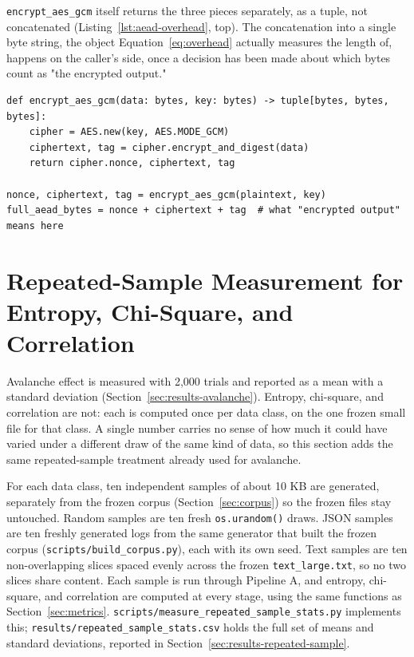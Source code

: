 \documentclass[12pt,a4paper,twoside]{report}
\numberwithin{equation}{chapter}
\begin{document}
\texttt{encrypt\_aes\_gcm} itself returns the three pieces separately,
as a tuple, not concatenated (Listing~\ref{lst:aead-overhead}, top).
The concatenation into a single byte string, the object Equation~\ref{eq:overhead} actually measures the length of, happens on
the caller's side, once a decision has been made about which bytes
count as "the encrypted output."

\begin{lstlisting}[caption={What gets concatenated into the full-AEAD
byte string that Equation~\ref{eq:overhead} is measured against
(\texttt{src/classical\_crypto.py},
\texttt{scripts/check\_aead\_overhead\_convention.py}).},
label={lst:aead-overhead}]
def encrypt_aes_gcm(data: bytes, key: bytes) -> tuple[bytes, bytes, bytes]:
    cipher = AES.new(key, AES.MODE_GCM)
    ciphertext, tag = cipher.encrypt_and_digest(data)
    return cipher.nonce, ciphertext, tag

nonce, ciphertext, tag = encrypt_aes_gcm(plaintext, key)
full_aead_bytes = nonce + ciphertext + tag  # what "encrypted output" means here
\end{lstlisting}

\section{Repeated-Sample Measurement for Entropy, Chi-Square, and Correlation}
\label{sec:repeated-sample}
Avalanche effect is measured with 2,000 trials and reported as a mean
with a standard deviation (Section~\ref{sec:results-avalanche}).
Entropy, chi-square, and correlation are not: each is computed once per
data class, on the one frozen small file for that class. A single
number carries no sense of how much it could have varied under a
different draw of the same kind of data, so this section adds the same
repeated-sample treatment already used for avalanche.

For each data class, ten independent samples of about 10 KB are
generated, separately from the frozen corpus (Section~\ref{sec:corpus})
so the frozen files stay untouched. Random samples are ten fresh
\texttt{os.urandom()} draws. JSON samples are ten freshly generated logs
from the same generator that built the frozen corpus
(\texttt{scripts/build\_corpus.py}), each with its own seed. Text
samples are ten non-overlapping slices spaced evenly across the frozen
\texttt{text\_large.txt}, so no two slices share content. Each sample is
run through Pipeline A, and entropy, chi-square, and correlation are
computed at every stage, using the same functions as
Section~\ref{sec:metrics}. \texttt{scripts/measure\_repeated\_sample\_stats.py}
implements this; \texttt{results/repeated\_sample\_stats.csv} holds the
full set of means and standard deviations, reported in
Section~\ref{sec:results-repeated-sample}.
\end{document}
